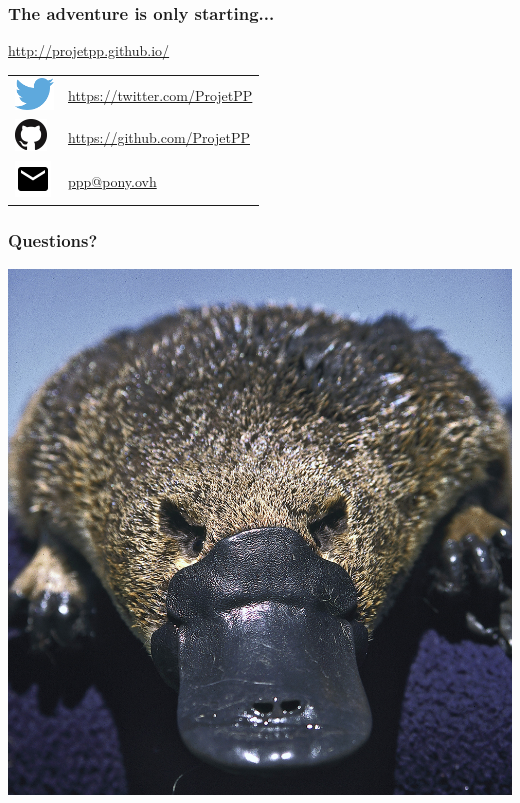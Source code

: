 \newlength{\logosize}
\setlength{\logosize}{12pt}
\begin{frame}
    \frametitle{The adventure is only starting...}
    \alert{\url{http://projetpp.github.io/}}

    \begin{tabular}{ll}
        \includegraphics[width=\logosize]{Twitter_logo_blue.png} & \href{https://twitter.com/ProjetPP}{https://twitter.com/ProjetPP}\\
        \includegraphics[width=\logosize]{GitHub-Mark-32px.png} &  \href{https://github.com/ProjetPP}{https://github.com/ProjetPP}\\
        \includegraphics[width=\logosize]{ic_email_black_18dp.png} & \href{mailto:ppp@pony.ovh}{ppp@pony.ovh}\\
    \end{tabular}
\end{frame}


\begin{frame}
    \frametitle{Questions?}
    \begin{center}
        \includegraphics[height=0.7\textheight]{figures/Ornithorhynchus.jpg}
    \end{center}
\end{frame}
